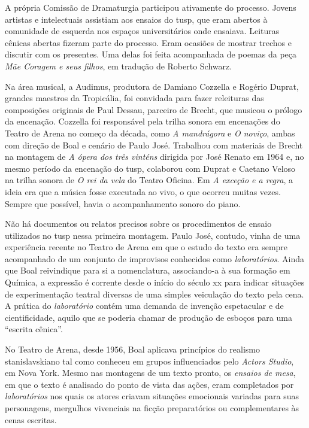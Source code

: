 A própria Comissão de Dramaturgia participou ativamente do processo.
Jovens artistas e intelectuais assistiam aos ensaios do {\sc tusp}, que eram
abertos à comunidade de esquerda nos espaços universitários onde
ensaiava. Leituras cênicas abertas fizeram parte do processo. Eram
ocasiões de mostrar trechos e discutir com os presentes. Uma delas foi
feita acompanhada de poemas da peça {\it Mãe Coragem e seus filhos}, em
tradução de Roberto Schwarz.

Na área musical, a Audimus, produtora de Damiano Cozzella e Rogério
Duprat, grandes maestros da Tropicália, foi convidada para fazer
releituras das composições originais de Paul Dessau, parceiro de Brecht,
que musicou o prólogo da encenação. Cozzella foi responsável pela trilha
sonora em encenações do Teatro de Arena no começo da década, como {\it A
mandrágora} e {\it O noviço}, ambas com direção de Boal e cenário de
Paulo José. Trabalhou com materiais de Brecht na montagem de {\it A
ópera dos três vinténs} dirigida por José Renato em 1964 e, no mesmo
período da encenação do {\sc tusp}, colaborou com Duprat e Caetano Veloso na
trilha sonora de {\it O rei da vela} do Teatro Oficina. Em {\it A
exceção e a regra}, a ideia era que a música fosse executada ao vivo, o que
ocorreu muitas vezes. Sempre que possível, havia o acompanhamento
sonoro do piano.

\subject{Ensaios e laboratórios}

Não há documentos ou relatos precisos sobre os procedimentos de ensaio
utilizados no {\sc tusp} nessa primeira montagem. Paulo José, contudo, vinha
de uma experiência recente no Teatro de Arena em que o estudo do texto
era sempre acompanhado de um conjunto de improvisos conhecidos como
{\it laboratórios}. Ainda que Boal reivindique para si a
nomenclatura, associando-a à sua formação em Química, a expressão é
corrente desde o início do século {\sc xx} para indicar situações de
experimentação teatral diversas de uma simples veiculação do texto pela
cena. A prática do {\it laboratório} contém uma demanda de invenção
espetacular e de cientificidade, aquilo que se poderia chamar de produção
de esboços para uma “escrita cênica”.

No Teatro de Arena, desde 1956, Boal aplicava princípios do realismo
stanislavskiano tal como conheceu em grupos influenciados pelo
{\it Actors Studio}, em Nova York. Mesmo nas montagens de um texto
pronto, os {\it ensaios de mesa}, em que o texto é analisado do
ponto de vista das ações, eram completados por {\it laboratórios} nos quais
os atores criavam situações emocionais variadas para suas personagens,
mergulhos vivenciais na ficção preparatórios ou complementares às cenas
escritas.

